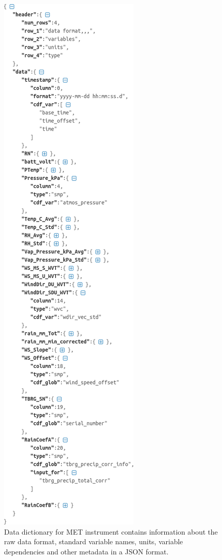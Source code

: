 \begin{figure}
 \centering
 \includegraphics[width=0.6\linewidth]{figures/met_dict.png}
 \caption{Data dictionary for MET instrument contains information about
	 the raw data format, standard variable names, units, variable dependencies
	 and other metadata in a JSON format.}
 \label{fig:met_dict}
\end{figure}


